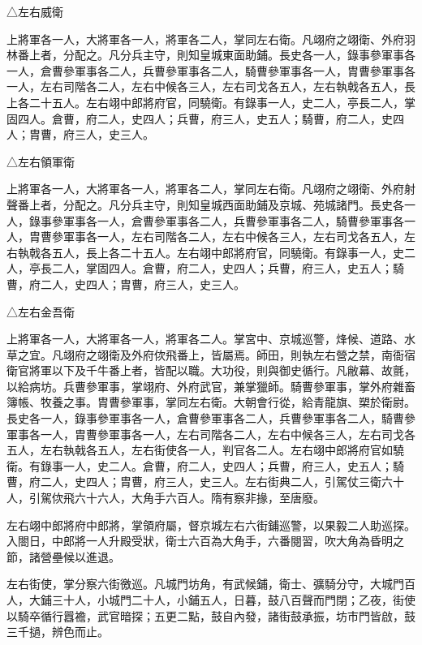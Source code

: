 \begin{pinyinscope}
 △左右威衛



 上將軍各一人，大將軍各一人，將軍各二人，掌同左右衛。凡翊府之翊衛、外府羽林番上者，分配之。凡分兵主守，則知皇城東面助鋪。長史各一人，錄事參軍事各一人，倉曹參軍事各二人，兵曹參軍事各二人，騎曹參軍事各一人，胄曹參軍事各一人，左右司階各二人，左右中候各三人，左右司戈各五人，左右執戟各五人，長上各二十五人。左右翊中郎將府官，同驍衛。有錄事一人，史二人，亭長二人，掌固四人。倉曹，府二人，史四人；兵曹，府三人，史五人；騎曹，府二人，史四人；胄曹，府三人，史三人。



 △左右領軍衛



 上將軍各一人，大將軍各一人，將軍各二人，掌同左右衛。凡翊府之翊衛、外府射聲番上者，分配之。凡分兵主守，則知皇城西面助鋪及京城、苑城諸門。長史各一人，錄事參軍事各一人，倉曹參軍事各二人，兵曹參軍事各二人，騎曹參軍事各一人，胄曹參軍事各一人，左右司階各二人，左右中候各三人，左右司戈各五人，左右執戟各五人，長上各二十五人。左右翊中郎將府官，同驍衛。有錄事一人，史二人，亭長二人，掌固四人。倉曹，府二人，史四人；兵曹，府三人，史五人；騎曹，府二人，史四人；胄曹，府三人，史三人。



 △左右金吾衛



 上將軍各一人，大將軍各一人，將軍各二人。掌宮中、京城巡警，烽候、道路、水草之宜。凡翊府之翊衛及外府佽飛番上，皆屬焉。師田，則執左右營之禁，南衙宿衛官將軍以下及千牛番上者，皆配以職。大功役，則與御史循行。凡敝幕、故氈，以給病坊。兵曹參軍事，掌翊府、外府武官，兼掌獵師。騎曹參軍事，掌外府雜畜簿帳、牧養之事。胄曹參軍事，掌同左右衛。大朝會行從，給青龍旗、槊於衛尉。長史各一人，錄事參軍事各一人，倉曹參軍事各二人，兵曹參軍事各二人，騎曹參軍事各一人，胄曹參軍事各一人，左右司階各二人，左右中候各三人，左右司戈各五人，左右執戟各五人，左右街使各一人，判官各二人。左右翊中郎將府官如驍衛。有錄事一人，史二人。倉曹，府二人，史四人；兵曹，府三人，史五人；騎曹，府二人，史四人；胄曹，府三人，史三人。左右街典二人，引駕仗三衛六十人，引駕佽飛六十六人，大角手六百人。隋有察非掾，至唐廢。



 左右翊中郎將府中郎將，掌領府屬，督京城左右六街鋪巡警，以果毅二人助巡探。入閤日，中郎將一人升殿受狀，衛士六百為大角手，六番閱習，吹大角為昏明之節，諸營壘候以進退。



 左右街使，掌分察六街徼巡。凡城門坊角，有武候鋪，衛士、彍騎分守，大城門百人，大鋪三十人，小城門二十人，小鋪五人，日暮，鼓八百聲而門閉；乙夜，街使以騎卒循行囂襜，武官暗探；五更二點，鼓自內發，諸街鼓承振，坊市門皆啟，鼓三千撾，辨色而止。




\end{pinyinscope}
